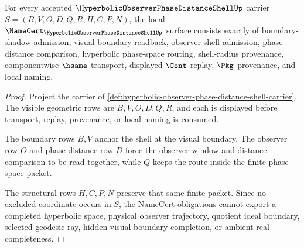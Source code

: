 \begin{theorem}
\label{thm:hyperbolic-observer-phase-distance-shell-namecert-obligations}
For every accepted $\HyperbolicObserverPhaseDistanceShellUp$ carrier $S=(B,V,O,D,Q,R,H,C,P,N)$, the local $\NameCert_{\HyperbolicObserverPhaseDistanceShellUp}$ surface consists exactly of boundary-shadow admission, visual-boundary readback, observer-shell admission, phase-distance comparison, hyperbolic phase-space routing, shell-radius provenance, componentwise $\hsame$ transport, displayed $\Cont$ replay, $\Pkg$ provenance, and local naming.
\end{theorem}
\begin{proof}
Project the carrier of \autoref{def:hyperbolic-observer-phase-distance-shell-carrier}. The visible geometric rows are $B,V,O,D,Q,R$, and each is displayed before transport, replay, provenance, or local naming is consumed.

The boundary rows $B,V$ anchor the shell at the visual boundary. The observer row $O$ and phase-distance row $D$ force the observer-window and distance comparison to be read together, while $Q$ keeps the route inside the finite phase-space packet.

The structural rows $H,C,P,N$ preserve that same finite packet. Since no excluded coordinate occurs in $S$, the NameCert obligations cannot export a completed hyperbolic space, physical observer trajectory, quotient ideal boundary, selected geodesic ray, hidden visual-boundary completion, or ambient real completeness.
\end{proof}

